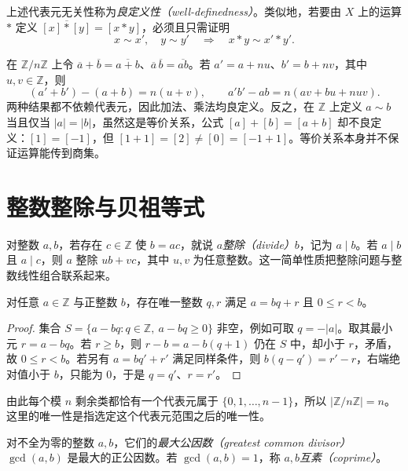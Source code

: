 上述代表元无关性称为\emph{良定义性（well-definedness）}。类似地，若要由 $X$ 上的运算 $*$ 定义 $[x]\mathbin{\overline *}[y]=[x*y]$，必须且只需证明
\begin{equation}\label{eq:operation-descends}
  x\sim x',\quad y\sim y'\quad\Longrightarrow\quad x*y\sim x'*y'.
\end{equation}

\begin{example}[剩余类运算的良定义性]\label{ex:residue-operations}
在 $\mathbb Z/n\mathbb Z$ 上令 $\overline a+\overline b=\overline{a+b}$、$\overline a\,\overline b=\overline{ab}$。若 $a'=a+nu$、$b'=b+nv$，其中 $u,v\in\mathbb Z$，则
\[
  (a'+b')-(a+b)=n(u+v),\qquad
  a'b'-ab=n(av+bu+nuv).
\]
两种结果都不依赖代表元，因此加法、乘法均良定义。反之，在 $\mathbb Z$ 上定义 $a\sim b$ 当且仅当 $|a|=|b|$，虽然这是等价关系，公式 $[a]+[b]=[a+b]$ 却不良定义：$[1]=[-1]$，但 $[1+1]=[2]\ne[0]=[-1+1]$。等价关系本身并不保证运算能传到商集。
\end{example}

\section{整数整除与贝祖等式}\label{sec:integer-divisibility}

对整数 $a,b$，若存在 $c\in\mathbb Z$ 使 $b=ac$，就说 $a$\emph{整除（divide）}$b$，记为 $a\mid b$。若 $a\mid b$ 且 $a\mid c$，则 $a$ 整除 $ub+vc$，其中 $u,v$ 为任意整数。这一简单性质把整除问题与整数线性组合联系起来。

\begin{theorem}[带余除法]\label{thm:integer-division}
对任意 $a\in\mathbb Z$ 与正整数 $b$，存在唯一整数 $q,r$ 满足 $a=bq+r$ 且 $0\leq r<b$。
\end{theorem}
\begin{proof}
集合 $S=\{a-bq:q\in\mathbb Z,\ a-bq\geq0\}$ 非空，例如可取 $q=-|a|$。取其最小元 $r=a-bq$。若 $r\geq b$，则 $r-b=a-b(q+1)$ 仍在 $S$ 中，却小于 $r$，矛盾，故 $0\leq r<b$。若另有 $a=bq'+r'$ 满足同样条件，则 $b(q-q')=r'-r$，右端绝对值小于 $b$，只能为 $0$，于是 $q=q'$、$r=r'$。
\end{proof}

由此每个模 $n$ 剩余类都恰有一个代表元属于 $\{0,1,\ldots,n-1\}$，所以 $|\mathbb Z/n\mathbb Z|=n$。这里的唯一性是指选定这个代表元范围之后的唯一性。

\begin{definition}[最大公因数与互素]
对不全为零的整数 $a,b$，它们的\emph{最大公因数（greatest common divisor）}$\gcd(a,b)$ 是最大的正公因数。若 $\gcd(a,b)=1$，称 $a,b$\emph{互素（coprime）}。
\end{definition}

